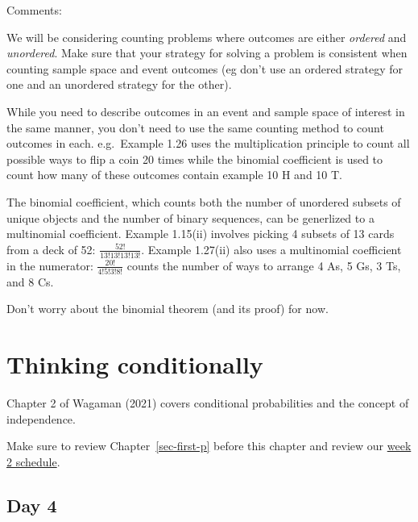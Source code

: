 \documentclass[
  letterpaper,
]{scrbook}
\begin{document}
Comments:

We will be considering counting problems where outcomes are either
\emph{ordered} and \emph{unordered}. Make sure that your strategy for
solving a problem is consistent when counting sample space and event
outcomes (eg don't use an ordered strategy for one and an unordered
strategy for the other).

While you need to describe outcomes in an event and sample space of
interest in the same manner, you don't need to use the same counting
method to count outcomes in each. e.g.~Example 1.26 uses the
multiplication principle to count all possible ways to flip a coin 20
times while the binomial coefficient is used to count how many of these
outcomes contain example 10 H and 10 T.

The binomial coefficient, which counts both the number of unordered
subsets of unique objects and the number of binary sequences, can be
generlized to a multinomial coefficient. Example 1.15(ii) involves
picking 4 subsets of 13 cards from a deck of 52:
\(\frac{52!}{13!13!13!13!}\). Example 1.27(ii) also uses a multinomial
coefficient in the numerator: \(\frac{20!}{4!5!3!8!}\) counts the number
of ways to arrange 4 As, 5 Gs, 3 Ts, and 8 Cs.

Don't worry about the binomial theorem (and its proof) for now.


\chapter{Thinking conditionally}\label{sec-think-cond}

Chapter 2 of Wagaman (2021) covers conditional probabilities and the
concept of independence.

Make sure to review Chapter~\ref{sec-first-p} before this chapter and
review our
\href{https://docs.google.com/spreadsheets/d/1e_yVbPgnfymWyik8cLP_5qgLQfekGSh_jvFxE7u53P0/edit?usp=sharing}{week
2 schedule}.

\section*{Day 4}\label{day-4}

\end{document}
